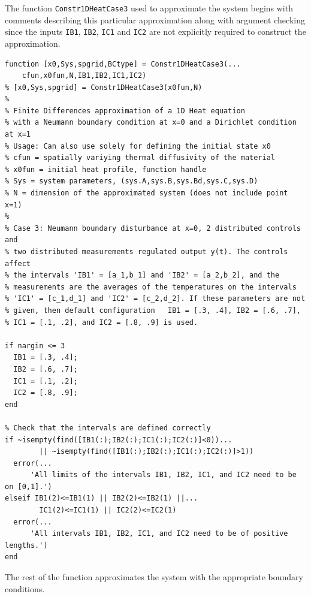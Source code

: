 \documentclass[11pt, a4paper]{amsart}
\theoremstyle{definition}
\numberwithin{equation}{section}
\begin{document}
The function \texttt{Constr1DHeatCase3} used to approximate the system begins with comments describing this particular approximation along with argument checking since the inputs \texttt{IB1}, \texttt{IB2}, \texttt{IC1} and \texttt{IC2} are not explicitly required to construct the approximation.

\begin{lstlisting}
function [x0,Sys,spgrid,BCtype] = Constr1DHeatCase3(...
    cfun,x0fun,N,IB1,IB2,IC1,IC2)
% [x0,Sys,spgrid] = Constr1DHeatCase3(x0fun,N)
% 
% Finite Differences approximation of a 1D Heat equation
% with a Neumann boundary condition at x=0 and a Dirichlet condition at x=1
% Usage: Can also use solely for defining the initial state x0
% cfun = spatially variying thermal diffusivity of the material
% x0fun = initial heat profile, function handle
% Sys = system parameters, (sys.A,sys.B,sys.Bd,sys.C,sys.D)
% N = dimension of the approximated system (does not include point x=1)
%
% Case 3: Neumann boundary disturbance at x=0, 2 distributed controls and 
% two distributed measurements regulated output y(t). The controls affect
% the intervals 'IB1' = [a_1,b_1] and 'IB2' = [a_2,b_2], and the
% measurements are the averages of the temperatures on the intervals 
% 'IC1' = [c_1,d_1] and 'IC2' = [c_2,d_2]. If these parameters are not
% given, then default configuration   IB1 = [.3, .4], IB2 = [.6, .7], 
% IC1 = [.1, .2], and IC2 = [.8, .9] is used.

if nargin <= 3
  IB1 = [.3, .4];
  IB2 = [.6, .7];
  IC1 = [.1, .2];
  IC2 = [.8, .9];
end

% Check that the intervals are defined correctly
if ~isempty(find([IB1(:);IB2(:);IC1(:);IC2(:)]<0))...
        || ~isempty(find([IB1(:);IB2(:);IC1(:);IC2(:)]>1))
  error(...
      'All limits of the intervals IB1, IB2, IC1, and IC2 need to be on [0,1].')
elseif IB1(2)<=IB1(1) || IB2(2)<=IB2(1) ||...
        IC1(2)<=IC1(1) || IC2(2)<=IC2(1)
  error(...
      'All intervals IB1, IB2, IC1, and IC2 need to be of positive lengths.')
end
  \end{lstlisting}

The rest of the function approximates the system with the appropriate boundary conditions.
\end{document}
